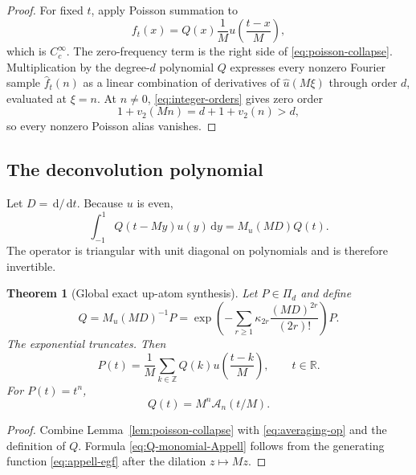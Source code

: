 \documentclass[11pt,oneside]{article}
\newtheorem{theorem}{Theorem}[section]
\theoremstyle{definition}
\theoremstyle{remark}
\newcommand{\R}{\mathbb R}
\newcommand{\Z}{\mathbb Z}
\newcommand{\dd}{\,\mathrm d}
\newcommand{\vtwo}{v_2}
\begin{document}
\begin{proof}
For fixed $t$, apply Poisson summation to
\[
 f_t(x)=Q(x)\frac1M u\!\left(\frac{t-x}{M}\right),
\]
which is $C_c^\infty$.  The zero-frequency term is the right side of \eqref{eq:poisson-collapse}.  Multiplication by the degree-$d$ polynomial $Q$ expresses every nonzero Fourier sample $\widehat f_t(n)$ as a linear combination of derivatives of $\widehat u(M\xi)$ through order $d$, evaluated at $\xi=n$.  At $n\ne0$, \eqref{eq:integer-orders} gives zero order
\[
 1+\vtwo(Mn)=d+1+\vtwo(n)>d,
\]
so every nonzero Poisson alias vanishes.
\end{proof}

\subsection{The deconvolution polynomial}
Let $D=\dd/\dd t$.  Because $u$ is even,
\begin{equation}
 \int_{-1}^{1}Q(t-My)u(y)\dd y=M_u(MD)Q(t).                \label{eq:averaging-op}
\end{equation}
The operator is triangular with unit diagonal on polynomials and is therefore invertible.

\begin{theorem}[Global exact up-atom synthesis]
\label{thm:global-synthesis}
Let $P\in\Pi_d$ and define
\begin{equation}
 Q=M_u(MD)^{-1}P
 =\exp\!\left(
 -\sum_{r\ge1}\kappa_{2r}\frac{(MD)^{2r}}{(2r)!}
 \right)P.                                                 \label{eq:Q-deconv}
\end{equation}
The exponential truncates.  Then
\begin{equation}
 \boxed{
 P(t)=\frac1M\sum_{k\in\Z}Q(k)
 u\!\left(\frac{t-k}{M}\right),\qquad t\in\R.}          \label{eq:global-up-synthesis}
\end{equation}
For $P(t)=t^n$,
\begin{equation}
 Q(t)=M^n\mathcal A_n(t/M).                                \label{eq:Q-monomial-Appell}
\end{equation}
\end{theorem}

\begin{proof}
Combine Lemma~\ref{lem:poisson-collapse} with \eqref{eq:averaging-op} and the definition of $Q$.  Formula \eqref{eq:Q-monomial-Appell} follows from the generating function \eqref{eq:appell-egf} after the dilation $z\mapsto Mz$.
\end{proof}
\end{document}
